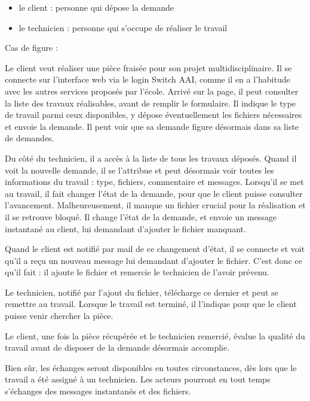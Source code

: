 \documentclass[
    iai, %
    eai, %
]{heig-tb}
\begin{document}
\begin{itemize}
  \item le client : personne qui dépose la demande
  \item le technicien : personne qui s'occupe de réaliser le travail
\end{itemize}

Cas de figure :

Le client veut réaliser une pièce fraisée pour son projet multidisciplinaire. Il se connecte sur l'interface web via le login Switch AAI, comme il en a l'habitude avec les autres services proposés par l'école. Arrivé sur la page, il peut consulter la liste des travaux réalisables, avant de remplir le formulaire. Il indique le type de travail parmi ceux disponibles, y dépose éventuellement les fichiers nécessaires et envoie la demande. Il peut voir que sa demande figure désormais dans sa liste de demandes.

Du côté du technicien, il a accès à la liste de tous les travaux déposés. Quand il voit la nouvelle demande, il se l'attribue et peut désormais voir toutes les informations du travail : type, fichiers, commentaire et messages. Lorsqu'il se met au travail, il fait changer l'état de la demande, pour que le client puisse consulter l'avancement.
Malheureusement, il manque un fichier crucial pour la réalisation et il se retrouve bloqué. Il change l'état de la demande, et envoie un message instantané au client, lui demandant d'ajouter le fichier manquant.

Quand le client est notifié par mail de ce changement d'état, il se connecte et voit qu'il a reçu un nouveau message lui demandant d'ajouter le fichier. C'est donc ce qu'il fait : il ajoute le fichier et remercie le technicien de l'avoir prévenu.

Le technicien, notifié par l'ajout du fichier, télécharge ce dernier et peut se remettre au travail. Lorsque le travail est terminé, il l'indique pour que le client puisse venir chercher la pièce.

Le client, une fois la pièce récupérée et le technicien remercié, évalue la qualité du travail avant de disposer de la demande désormais accomplie.


Bien sûr, les échanges seront disponibles en toutes circonstances, dès lors que le travail a été assigné à un technicien. Les acteurs pourront en tout temps s'échanges des messages instantanés et des fichiers.
\end{document}
